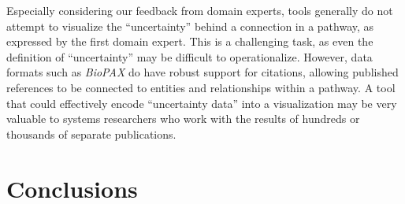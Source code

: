 \documentclass{egpubl}
\begin{document}
Especially considering our feedback from domain experts, tools generally do not attempt to visualize the ``uncertainty'' behind a connection in a pathway, as expressed by the first domain expert. This is a challenging task, as even the definition of ``uncertainty'' may be difficult to operationalize. However, data formats such as \emph{BioPAX} do have robust support for citations, allowing published references to be connected to entities and relationships within a pathway. A tool that could effectively encode ``uncertainty data'' into a visualization may be very valuable to systems researchers who work with the results of hundreds or thousands of separate publications.

\section{Conclusions}




%



\end{document}
